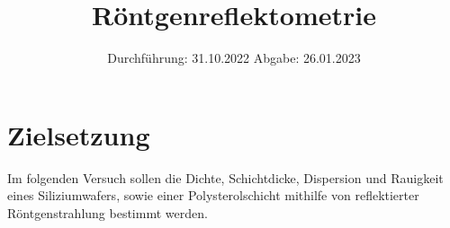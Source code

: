 

\subject{V44}
\title{Röntgenreflektometrie}
\date{
    Durchführung: 31.10.2022
     \hspace{3em}
    Abgabe: 26.01.2023
}


\maketitle
\thispagestyle{empty}
\tableofcontents
\newpage

\section{Zielsetzung}

    Im folgenden Versuch sollen die Dichte,
    Schichtdicke,
    Dispersion und Rauigkeit eines Siliziumwafers,
    sowie einer Polysterolschicht mithilfe von reflektierter Röntgenstrahlung bestimmt werden.


\clearpage


\clearpage


\clearpage


\clearpage

\printbibliography



